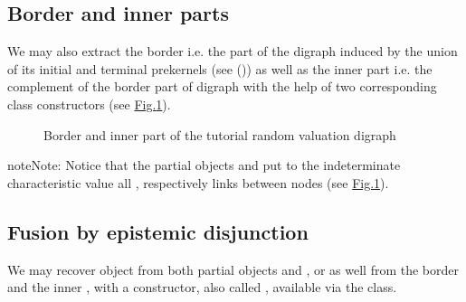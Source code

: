 \documentclass[a4paper,10pt,english]{sphinxhowto}
\let\sphinxpxdimen\pdfpxdimen\else\newdimen\sphinxpxdimen
\begin{document}
\subsection{Border and inner parts}
\label{\detokenize{tutorial:border-and-inner-parts}}
We may also extract the border \sphinxhyphen{}i.e. the part of the digraph induced by the union of its initial and terminal prekernels (see {\hyperref[\detokenize{tutorial:kernel-tutorial-label}]{}} ()) \sphinxhyphen{}  as well as the inner part \sphinxhyphen{}i.e. the complement of the border part\sphinxhyphen{} of digraph  with the help of two corresponding class constructors (see \hyperref[\detokenize{tutorial:graphborderandinner}]{Fig.\@ \ref{\detokenize{tutorial:graphborderandinner}}}).

\begin{sphinxVerbatim}[commandchars=\\\{\},numbers=left,firstnumber=1,stepnumber=1]
\end{sphinxVerbatim}

\begin{figure}[htbp]
\centering
\capstart

\noindent\sphinxincludegraphics[width=600\sphinxpxdimen]{{graphBorderAndInner}.png}
\caption{Border and inner part of the tutorial random valuation digraph}\label{\detokenize{tutorial:graphborderandinner}}\end{figure}

\begin{sphinxadmonition}{note}{Note:}
Notice that the partial objects  and  put to the indeterminate characteristic value all , respectively  links between nodes (see \hyperref[\detokenize{tutorial:graphborderandinner}]{Fig.\@ \ref{\detokenize{tutorial:graphborderandinner}}}).
\end{sphinxadmonition}


\subsection{Fusion by epistemic disjunction}
\label{\detokenize{tutorial:fusion-by-epistemic-disjunction}}
We may recover object  from both partial objects  and , or as well from the border  and the inner , with a  constructor, also called , available via the  class.
\end{document}
